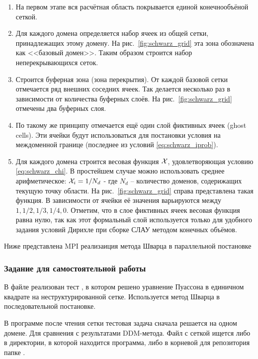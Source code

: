 \begin{enumerate}
\item На первом этапе вся расчётная область покрывается единой конечнообъёной сеткой.
\item Для каждого домена определяется набор ячеек из общей сетки, принадлежащих этому домену. На рис.~\ref{fig:schwarz_grid}
эта зона обозначена как <<базовый домен>>. Таким образом строится набор неперекрывающихся сеток.
\item Строится буферная зона (зона перекрытия). От каждой базовой сетки отмечается ряд внешних соседних ячеек. Так делается несколько раз в зависимости от количества буферных слоёв.
      На рис.~\ref{fig:schwarz_grid} отмечены два буферных слоя.
\item По такому же принципу отмечается ещё один слой фиктивных ячеек (ghost cells). Эти ячейки будут использоваться для постановки условия
      на междоменной границе (последнее из условий \cref{eq:schwarz_iprob}).
\item Для каждого домена строится весовая функция $\mathcal{X}$, удовлетворяющая условию \cref{eq:schwarz_chi}.
      В простейшем случае можно использовать среднее арифметическое: $\mathcal{X}_i = 1/N_d$ - где $N_d$ -- количество доменов, содерижащих текущую точку области.
      На рис.~\ref{fig:schwarz_grid} справа представлена такая функция. В зависимости от ячейки её значения варьируются между $1, 1/2, 1/3, 1/4, 0$.
      Отметим, что в слое фиктивных ячеек весовая функция равна нулю, так как этот формальный слой используется только для удобного задания условий Дирихле
      при сборке СЛАУ методом конечных объёмов.
\end{enumerate}

Ниже представлена MPI реализаиция метода Шварца в параллельной постановке


\subsubsection{Задание для самостоятельной работы}
В файле 
реализован тест ,
в котором решено уравнение Пуассона в единичном квадрате на неструктурированной сетке.
Используется метод Шварца в последовательной постановке.

В программе после чтения сетки тестовая задача сначала решается на одном домене. Для
сравнения с результатами DDM-метода.
Файл с сеткой ищется либо в директории, в которой находится программа, либо в корневой для репозитория папке .

